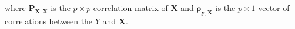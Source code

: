 \noindent where
$\mathbf{P}_{\mathbf{X}, \mathbf{X}}$
is the $p \times p$ correlation matrix of $\mathbf{X}$
and
$\boldsymbol{\rho}_{\mathbf{y}, \mathbf{X}}$
is the
$p \times 1$
vector of correlations between the $Y$ and $\mathbf{X}$.
